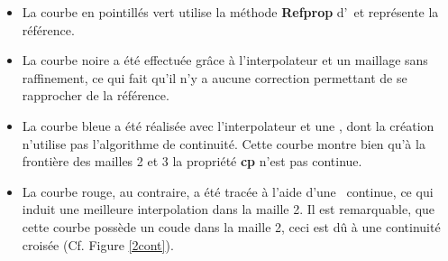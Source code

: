   \begin{itemize}
   \item[\textbullet] La courbe en pointillés vert utilise la méthode \textbf{Refprop} d'\EOS\ et représente la référence.
   \vspace{0.2cm}
   \item[\textbullet] La courbe noire a été effectuée grâce à l'interpolateur et un maillage sans raffinement, 
   ce qui fait qu'il n'y a aucune correction permettant de se rapprocher de la référence.
   \vspace{0.2cm}
   \item[\textbullet] La courbe bleue a été réalisée avec l'interpolateur et une \bdd, dont la création n'utilise pas l'algorithme de continuité.
   Cette courbe montre bien qu'à la frontière des mailles 2 et 3 la propriété \textbf{cp} n'est pas continue.
   \vspace{0.2cm}
   \item[\textbullet] La courbe rouge, au contraire, a été tracée à l'aide d'une \bdd\ continue, ce qui induit une meilleure interpolation dans la maille 2.
   Il est remarquable, que cette courbe possède un coude dans la maille 2, ceci est dû à une continuité croisée (Cf. Figure \ref{2cont}).
  \end{itemize}

  
  
  
  
 
 
  
